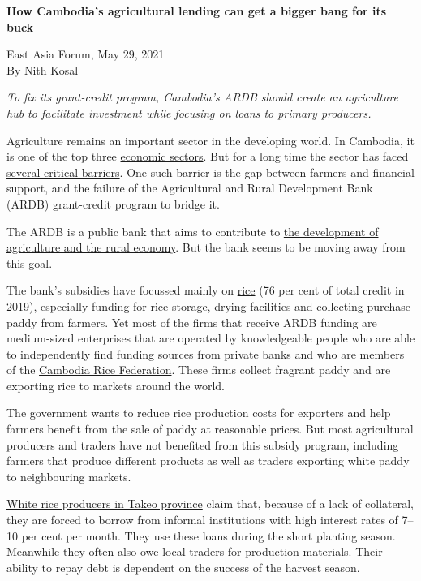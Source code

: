 \documentclass[10pt,a4paper]{letter}
\begin{document}
	
{\Large 
	\textbf{How Cambodia's agricultural lending can get a bigger bang for its buck}
}

East Asia Forum, May 29, 2021\\
By Nith Kosal

\textit{To fix its grant-credit program, Cambodia's ARDB should create an agriculture hub to facilitate investment while focusing on loans to primary producers.}

Agriculture remains an important sector in the developing world. In Cambodia, it is one of the top three \href{https://www.eastasiaforum.org/2021/03/20/cambodia-prioritises-economic-diplomacy/}{economic sectors}. But for a long time the sector has faced \href{https://www.worldbank.org/en/country/cambodia/publication/cambodian-agriculture-in-transition-opportunities-and-risks}{several critical barriers}. One such barrier is the gap between farmers and financial support, and the failure of the Agricultural and Rural Development Bank (ARDB) grant-credit program to bridge it.

The ARDB is a public bank that aims to contribute to \href{https://drive.google.com/file/d/1Cv-OzBXGhzOpcgZFTeuoQpgqAyQ_urdy/view}{the development of agriculture and the rural economy}. But the bank seems to be moving away from this goal.

The bank's subsidies have focussed mainly on \href{https://drive.google.com/file/d/19A94VB5emsh9LdvKMBTLZvdhTVoP6m7u/view}{rice} (76 per cent of total credit in 2019), especially funding for rice storage, drying facilities and collecting purchase paddy from farmers. Yet most of the firms that receive ARDB funding are medium-sized enterprises that are operated by knowledgeable people who are able to independently find funding sources from private banks and who are members of the \href{http://www.crf.org.kh/}{Cambodia Rice Federation}. These firms collect fragrant paddy and are exporting rice to markets around the world.

The government wants to reduce rice production costs for exporters and help farmers benefit from the sale of paddy at reasonable prices. But most agricultural producers and traders have not benefited from this subsidy program, including farmers that produce different products as well as traders exporting white paddy to neighbouring markets.

\href{https://link.springer.com/chapter/10.1007/978-981-15-0998-8_15}{White rice producers in Takeo province} claim that, because of a lack of collateral, they are forced to borrow from informal institutions with high interest rates of 7--10 per cent per month. They use these loans during the short planting season. Meanwhile they often also owe local traders for production materials. Their ability to repay debt is dependent on the success of the harvest season.
\end{document}
